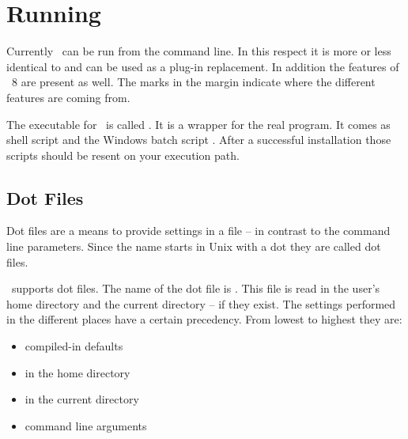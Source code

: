 

\section{Running \ExBib}

Currently \ExBib\ can be run from the command line. In this respect it
is more or less identical to \BibTeX{} and can be
used as a plug-in replacement. In addition the features of
\BibTeX~8 are present as well. The marks in
the margin indicate where the different features are coming from.

The executable for \ExBib\ is called . It is a wrapper
for the real program. It comes as shell script  and the
Windows batch script . After a successful installation
those scripts should be resent on your execution path.


\subsection{Dot Files}%
\label{sec:dot.files}

Dot files are a means to provide settings in a file -- in contrast to
the command line parameters. Since the name starts in Unix
with a dot they are called dot files.

\ExBib\ supports dot files. The name of the dot file is .
This file is read in the user's home directory and the current
directory -- if they exist. The settings performed in the different
places have a certain precedency. From lowest to highest they are:

\begin{itemize}
\item compiled-in defaults
\item {} in the home directory
\item {} in the current directory
\item command line arguments
\end{itemize}

